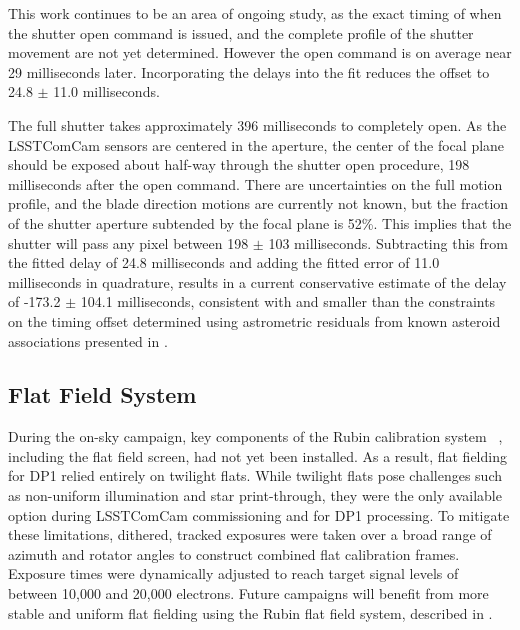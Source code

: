 This work continues to be an area of ongoing study, as the exact timing of when the shutter open command is issued, and the complete profile of the shutter movement are not yet determined.
However the open command is on average near 29 milliseconds later. Incorporating the delays into the fit reduces the offset to 24.8 $\pm$ 11.0 milliseconds.

The full shutter takes approximately 396 milliseconds to completely open.
As the \gls{LSSTComCam} sensors are centered in the aperture, the center of the focal plane should be exposed about half-way through the shutter open procedure, 198 milliseconds after the open command.
There are uncertainties on the full motion profile, and the blade direction motions are currently not known, but the fraction of the shutter aperture subtended by the focal plane is 52\%.
This implies that the shutter will pass any pixel between 198 $\pm$ 103 milliseconds.
Subtracting this from the fitted delay of 24.8 milliseconds and adding the fitted error of 11.0 milliseconds in quadrature, results in a current conservative estimate of the delay of -173.2 $\pm$ 104.1 milliseconds, consistent with and smaller than the constraints on the timing offset determined using astrometric residuals from known asteroid associations presented in .

\subsection{Flat Field System}
\label{ssec:flat_field_system}
During the on-sky campaign, key components of the Rubin calibration system ~\citep{2022SPIE12182E..0RI}, including the flat field screen, had not yet been installed.
As a result, flat fielding for \gls{DP1} relied entirely on twilight flats.
While twilight flats pose challenges such as non-uniform illumination and star print-through, they were the only available option during \gls{LSSTComCam} commissioning and for DP1 processing.
To mitigate these limitations, dithered, tracked exposures were taken over a broad range of azimuth and rotator angles to construct combined flat \gls{calibration} frames.
Exposure times were dynamically adjusted to reach target signal levels of between 10,000 and 20,000 electrons.
Future campaigns will benefit from more stable and uniform flat fielding using the Rubin flat field system, described in \citet{SITCOMTN-086}.

